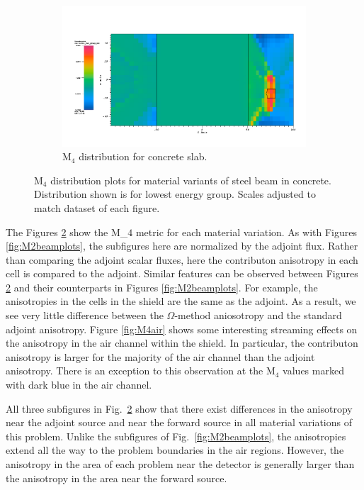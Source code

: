 \begin{figure}[htb!]\ContinuedFloat
  \centering
  \begin{subfigure}[t]{\textwidth}
    \includegraphics[width=0.9\linewidth]{./chapters/characterization_probs/figures/char/prob1v2/prob1v2M4G26.png}
    \caption{M$_4$ distribution for concrete slab.}
    \label{fig:M4concrete}
  \end{subfigure}
  \caption[M$_4$ distribution plots for material variants of steel beam in
  concrete.]{M$_4$ distribution plots for material variants of steel beam in
  concrete. Distribution shown is for lowest energy group. Scales adjusted to
  match dataset of each figure.}
  \label{fig:M4beamplots}
\end{figure}

The Figures \ref{fig:M4beamplots} show the M_$4$ metric for each material variation. As with Figures \ref{fig:M2beamplots}, the
subfigures here are normalized by the adjoint flux. Rather than comparing the
adjoint scalar fluxes, here the contributon anisotropy in each
cell is compared to the adjoint. Similar features can be observed between Figures \ref{fig:M4beamplots} and their counterparts in Figures
\ref{fig:M2beamplots}. For example, the anisotropies in the cells in the shield
are the same as the adjoint. As a result, we see very little difference
between the $\Omega$-method aniosotropy and the standard adjoint anisotropy.
Figure \ref{fig:M4air} shows some interesting streaming effects on the
anisotropy in the air channel within the shield. In particular, the contributon
anisotropy is larger for the majority of the air channel than the adjoint
anisotropy. There is an exception to this observation at the M$_4$ values marked
with dark blue in the air channel.

All three subfigures in Fig.~\ref{fig:M4beamplots} show that there exist differences
in the anisotropy near the adjoint source and near the forward source in all
material variations of this problem. Unlike the subfigures of
Fig.~\ref{fig:M2beamplots}, the anisotropies extend all the way to the problem
boundaries in the air regions. However,
the anisotropy in the area of each
problem near the detector is generally larger than the anisotropy in the area
near the forward source.

